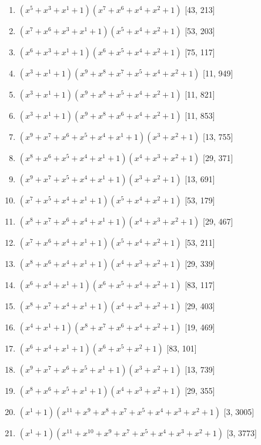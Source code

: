 \documentclass[10pt,twocolumn]{article}
\begin{document}
\begin{enumerate}
\item $(x^{5} + x^{3} + x^{1} + 1)(x^{7} + x^{6} + x^{4} + x^{2} + 1)$  [43, 213]
\item $(x^{7} + x^{6} + x^{3} + x^{1} + 1)(x^{5} + x^{4} + x^{2} + 1)$  [53, 203]
\item $(x^{6} + x^{3} + x^{1} + 1)(x^{6} + x^{5} + x^{4} + x^{2} + 1)$  [75, 117]
\item $(x^{3} + x^{1} + 1)(x^{9} + x^{8} + x^{7} + x^{5} + x^{4} + x^{2} + 1)$  [11, 949]
\item $(x^{3} + x^{1} + 1)(x^{9} + x^{8} + x^{5} + x^{4} + x^{2} + 1)$  [11, 821]
\item $(x^{3} + x^{1} + 1)(x^{9} + x^{8} + x^{6} + x^{4} + x^{2} + 1)$  [11, 853]
\item $(x^{9} + x^{7} + x^{6} + x^{5} + x^{4} + x^{1} + 1)(x^{3} + x^{2} + 1)$  [13, 755]
\item $(x^{8} + x^{6} + x^{5} + x^{4} + x^{1} + 1)(x^{4} + x^{3} + x^{2} + 1)$  [29, 371]
\item $(x^{9} + x^{7} + x^{5} + x^{4} + x^{1} + 1)(x^{3} + x^{2} + 1)$  [13, 691]
\item $(x^{7} + x^{5} + x^{4} + x^{1} + 1)(x^{5} + x^{4} + x^{2} + 1)$  [53, 179]
\item $(x^{8} + x^{7} + x^{6} + x^{4} + x^{1} + 1)(x^{4} + x^{3} + x^{2} + 1)$  [29, 467]
\item $(x^{7} + x^{6} + x^{4} + x^{1} + 1)(x^{5} + x^{4} + x^{2} + 1)$  [53, 211]
\item $(x^{8} + x^{6} + x^{4} + x^{1} + 1)(x^{4} + x^{3} + x^{2} + 1)$  [29, 339]
\item $(x^{6} + x^{4} + x^{1} + 1)(x^{6} + x^{5} + x^{4} + x^{2} + 1)$  [83, 117]
\item $(x^{8} + x^{7} + x^{4} + x^{1} + 1)(x^{4} + x^{3} + x^{2} + 1)$  [29, 403]
\item $(x^{4} + x^{1} + 1)(x^{8} + x^{7} + x^{6} + x^{4} + x^{2} + 1)$  [19, 469]
\item $(x^{6} + x^{4} + x^{1} + 1)(x^{6} + x^{5} + x^{2} + 1)$  [83, 101]
\item $(x^{9} + x^{7} + x^{6} + x^{5} + x^{1} + 1)(x^{3} + x^{2} + 1)$  [13, 739]
\item $(x^{8} + x^{6} + x^{5} + x^{1} + 1)(x^{4} + x^{3} + x^{2} + 1)$  [29, 355]
\item $(x^{1} + 1)(x^{11} + x^{9} + x^{8} + x^{7} + x^{5} + x^{4} + x^{3} + x^{2} + 1)$  [3, 3005]
\item $(x^{1} + 1)(x^{11} + x^{10} + x^{9} + x^{7} + x^{5} + x^{4} + x^{3} + x^{2} + 1)$  [3, 3773]

\end{enumerate}
\end{document}
